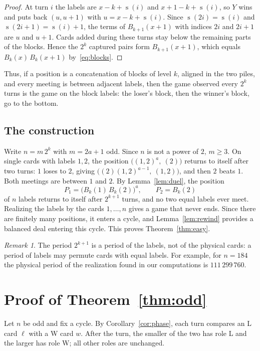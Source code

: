\documentclass[11pt,a4paper]{amsart}
\theoremstyle{definition}
\theoremstyle{remark}
\newtheorem{remark}[theorem]{Remark}
\newcommand{\pc}{\operatorname{s}}
\begin{document}
\begin{proof}
At turn $i$ the labels are $x-k+\pc(i)$ and $x+1-k+\pc(i)$, so $Y$ wins and puts back $(u,u+1)$ with $u=x-k+\pc(i)$. Since $\pc(2i)=\pc(i)$ and $\pc(2i+1)=\pc(i)+1$, the terms of $B_{k+1}(x+1)$ with indices $2i$ and $2i+1$ are $u$ and $u+1$. Cards added during these turns stay below the remaining parts of the blocks. Hence the $2^k$ captured pairs form $B_{k+1}(x+1)$, which equals $B_k(x)\,B_k(x+1)$ by~\eqref{eq:blocks}.
\end{proof}

Thus, if a position is a concatenation of blocks of level $k$, aligned in the two piles, and every meeting is between adjacent labels, then the game observed every $2^k$ turns is the game on the block labels: the loser's block, then the winner's block, go to the bottom.

\subsection{The construction} Write $n=m\,2^k$ with $m=2a+1$ odd. Since $n$ is not a power of $2$, $m\ge3$. On single cards with labels $1,2$, the position $\bigl((1,2)^a,\ (2)\bigr)$ returns to itself after two turns: $1$ loses to $2$, giving $\bigl((2)(1,2)^{a-1},\ (1,2)\bigr)$, and then $2$ beats $1$. Both meetings are between $1$ and $2$. By Lemma~\ref{lem:duel}, the position
\[
P_1=\bigl(B_k(1)\,B_k(2)\bigr)^a,\qquad P_2=B_k(2)
\]
of $n$ labels returns to itself after $2^{k+1}$ turns, and no two equal labels ever meet. Realizing the labels by the cards $1,\dots,n$ gives a game that never ends. Since there are finitely many positions, it enters a cycle, and Lemma~\ref{lem:rewind} provides a balanced deal entering this cycle. This proves Theorem~\ref{thm:easy}.

\begin{remark}
The period $2^{k+1}$ is a period of the labels, not of the physical cards: a period of labels may permute cards with equal labels. For example, for $n=184$ the physical period of the realization found in our computations is $111\,299\,760$.
\end{remark}

\section{Proof of Theorem~\ref{thm:odd}}\label{sec:odd}

Let $n$ be odd and fix a cycle. By Corollary~\ref{cor:phase}, each turn compares an L card $\ell$ with a W card $w$. After the turn, the smaller of the two has role L and the larger has role W; all other roles are unchanged.
\end{document}

